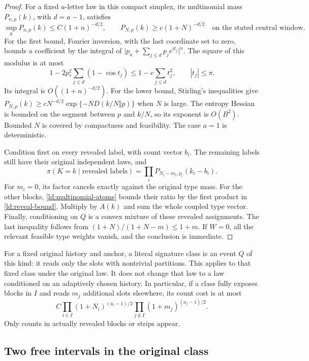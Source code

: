 \begin{proof}
For a fixed \(a\)-letter law in this compact simplex, its multinomial
mass \(P_{n,p}(k)\), with \(d=a-1\), satisfies
\begin{equation}
 \sup_kP_{n,p}(k)\le C(1+n)^{-d/2},\qquad
 P_{N,p}(k)\ge c(1+N)^{-d/2}
 \quad\text{on the stated central window}.
 \label{ld:multinomial-atoms}
\end{equation}
For the first bound, Fourier inversion, with the last coordinate set
to zero, bounds a coefficient by the integral of
\(\lvert p_a+\sum_{j\le d}p_je^{it_j}\rvert^n\).  The square of
this modulus is at most
\[
 1-2p_*^2\sum_{j\le d}(1-\cos t_j)
       \le1-c\sum_{j\le d}t_j^2,\qquad |t_j|\le\pi.
\]
Its integral is \(O((1+n)^{-d/2})\).  For the lower bound, Stirling's
inequalities give
\(P_{N,p}(k)\ge cN^{-d/2}\exp\{-ND(k/N\Vert p)\}\) when
\(N\) is large.  The entropy Hessian is bounded on the segment between
\(p\) and \(k/N\), so its exponent is \(O(B^2)\).  Bounded \(N\)
is covered by compactness and feasibility.  The case \(a=1\) is
deterministic.

Condition first on every revealed label, with count vector \(b_i\).
The remaining labels still have their original independent laws, and
\[
 \pi(K=k\mid\text{revealed labels})
       =\prod_iP_{N_i-m_i,p_i}(k_i-b_i).
\]
For \(m_i=0\), its factor cancels exactly against the original type
mass.  For the other blocks, \eqref{ld:multinomial-atoms} bounds their
ratio by the first product in \eqref{ld:reveal-bound}.  Multiply by
\(A(k)\) and sum the whole coupled type vector.  Finally, conditioning
on \(Q\) is a convex mixture of these revealed assignments.
The last inequality follows from
\((1+N)/(1+N-m)\le1+m\).  If \(W=0\), all the relevant feasible
type weights vanish, and the conclusion is immediate.
\end{proof}

For a fixed original history and anchor, a literal signature class is
an event \(Q\) of this kind: it reads only the slots with nontrivial
partitions.  This applies to that fixed class under the original law.
It does not change that law to a law conditioned on an adaptively chosen
history.  In particular, if a class fully exposes blocks in \(I\) and
reads \(m_j\) additional slots elsewhere, its count cost is at most
\[
 C\prod_{i\in I}(1+N_i)^{(a_i-1)/2}
       \prod_{j\notin I}(1+m_j)^{(a_j-1)/2}.
\]
Only counts in actually revealed blocks or strips appear.

\subsection{Two free intervals in the original class}

